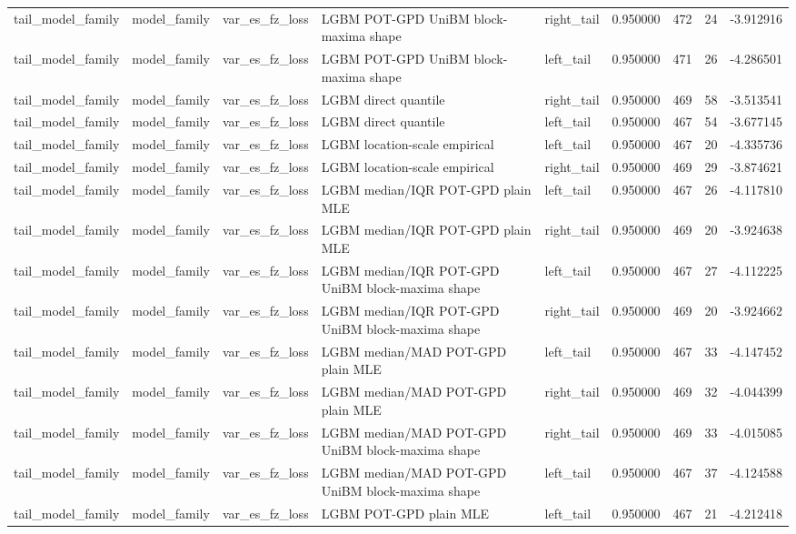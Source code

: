 \begin{tabular}{lllllrrrr}
tail\_model\_family & model\_family & var\_es\_fz\_loss & LGBM POT-GPD UniBM block-maxima shape & right\_tail & 0.950000 & 472 & 24 & -3.912916 \\
tail\_model\_family & model\_family & var\_es\_fz\_loss & LGBM POT-GPD UniBM block-maxima shape & left\_tail & 0.950000 & 471 & 26 & -4.286501 \\
tail\_model\_family & model\_family & var\_es\_fz\_loss & LGBM direct quantile & right\_tail & 0.950000 & 469 & 58 & -3.513541 \\
tail\_model\_family & model\_family & var\_es\_fz\_loss & LGBM direct quantile & left\_tail & 0.950000 & 467 & 54 & -3.677145 \\
tail\_model\_family & model\_family & var\_es\_fz\_loss & LGBM location-scale empirical & left\_tail & 0.950000 & 467 & 20 & -4.335736 \\
tail\_model\_family & model\_family & var\_es\_fz\_loss & LGBM location-scale empirical & right\_tail & 0.950000 & 469 & 29 & -3.874621 \\
tail\_model\_family & model\_family & var\_es\_fz\_loss & LGBM median/IQR POT-GPD plain MLE & left\_tail & 0.950000 & 467 & 26 & -4.117810 \\
tail\_model\_family & model\_family & var\_es\_fz\_loss & LGBM median/IQR POT-GPD plain MLE & right\_tail & 0.950000 & 469 & 20 & -3.924638 \\
tail\_model\_family & model\_family & var\_es\_fz\_loss & LGBM median/IQR POT-GPD UniBM block-maxima shape & left\_tail & 0.950000 & 467 & 27 & -4.112225 \\
tail\_model\_family & model\_family & var\_es\_fz\_loss & LGBM median/IQR POT-GPD UniBM block-maxima shape & right\_tail & 0.950000 & 469 & 20 & -3.924662 \\
tail\_model\_family & model\_family & var\_es\_fz\_loss & LGBM median/MAD POT-GPD plain MLE & left\_tail & 0.950000 & 467 & 33 & -4.147452 \\
tail\_model\_family & model\_family & var\_es\_fz\_loss & LGBM median/MAD POT-GPD plain MLE & right\_tail & 0.950000 & 469 & 32 & -4.044399 \\
tail\_model\_family & model\_family & var\_es\_fz\_loss & LGBM median/MAD POT-GPD UniBM block-maxima shape & right\_tail & 0.950000 & 469 & 33 & -4.015085 \\
tail\_model\_family & model\_family & var\_es\_fz\_loss & LGBM median/MAD POT-GPD UniBM block-maxima shape & left\_tail & 0.950000 & 467 & 37 & -4.124588 \\
tail\_model\_family & model\_family & var\_es\_fz\_loss & LGBM POT-GPD plain MLE & left\_tail & 0.950000 & 467 & 21 & -4.212418 \\

\end{tabular}
